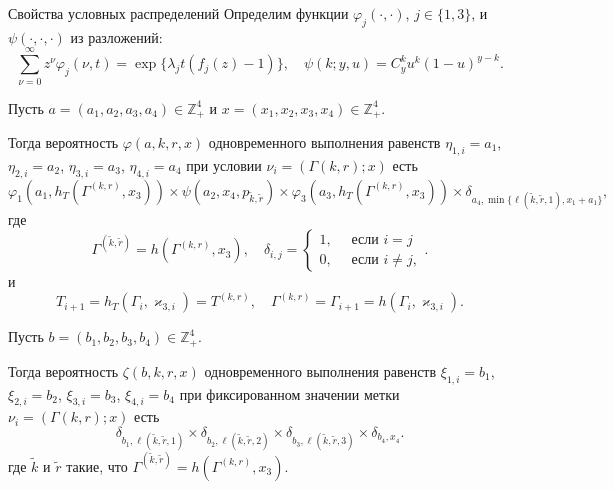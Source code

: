 \documentclass[10pt]{beamer}
\begin{document}
\begin{frame}[allowframebreaks]{Свойства условных распределений}
Определим функции $\varphi_j(\cdot,\cdot)$, $j\in \{1,3\}$, и $\psi(\cdot, \cdot, \cdot)$ из разложений:
\begin{equation*}
\sum_{\nu=0}^{\infty} z^\nu\varphi_j(\nu,t) = \exp\{\lambda_j t (f_j(z)-1)\}, \quad \psi(k;y,u)=C_y^k u^k (1-u)^{y-k}.	
\end{equation*}

Пусть $a=(a_1, a_2, a_3, a_4) \in \mathbb{Z}_+^4$ и $x=(x_1, x_2, x_3, x_4) \in \mathbb{Z}_+^4$.

Тогда вероятность $\varphi(a,k,r,x)$ одновременного выполнения равенств $\eta_{1,i}=a_1$, $\eta_{2,i}=a_2$, $\eta_{3,i}=a_3$, $\eta_{4,i}=a_4$ при условии  $\nu_i=(\Gamma{(k,r)}; x)$ есть 
\begin{equation}
\!\!\varphi_1(a_1,h_T(\Gamma^{({k},{r})},x_3)) \times \psi(a_2,x_4, p_{\tilde{k},\tilde{r}}) \times \varphi_3(a_3,h_T(\Gamma^{({k},{r})},x_3))
\times \delta_{a_4,\min{\{\ell(\tilde{k},\tilde{r},1), x_1+a_1}\}},
\end{equation}
где
\begin{equation*}
\Gamma^{(\tilde{k},\tilde{r})}=h(\Gamma^{(k,r)},x_3), \quad \delta_{i,j}=\begin{cases} 1, \quad \text{ если }i=j\\0, \quad \text{ если } i\neq j,
\end{cases}.
\end{equation*}
и 
$$
T_{i+1}=h_T(\Gamma_i,\varkappa_{3,i})= T^{(k,r)},\quad  \Gamma^{(k,r)}=\Gamma_{i+1}=h(\Gamma_i,\varkappa_{3,i}).
$$
\framebreak

Пусть $b=(b_1, b_2, b_3, b_4) \in \mathbb{Z}_+^4$. 

Тогда вероятность $\zeta(b, k, r, x)$ одновременного выполнения равенств $\xi_{1,i}=b_1$, $\xi_{2,i}=b_2$, $\xi_{3,i}=b_3$, $\xi_{4,i}=b_4$ при фиксированном значении метки $\nu_i=(\Gamma{(k,r)}; x)$ есть
\begin{equation}
\delta_{b_1,\ell(\tilde{k},\tilde{r},1)} \times \delta_{b_2,\ell(\tilde{k},\tilde{r},2)} \times 
\delta_{b_3,\ell(\tilde{k},\tilde{r},3)} \times \delta_{b_4,x_4}.
\end{equation}
где $\tilde{k}$ и $\tilde{r}$ такие, что $\Gamma^{(\tilde{k},\tilde{r})}=h(\Gamma^{(k,r)},x_3)$.
\end{frame}
\end{document}
